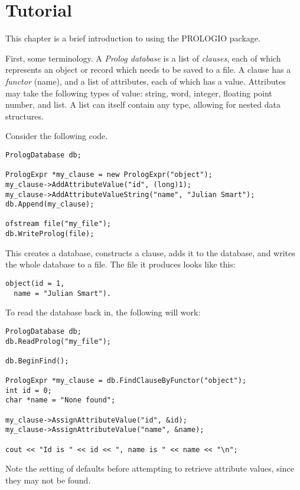 \chapter{Tutorial}

This chapter is a brief introduction to using the PROLOGIO package.

First, some terminology.  A {\it Prolog database}\/ is a list of {\it clauses},
each of which represents an object or record which needs to be saved to a file.
A clause has a {\it functor}\/ (name), and a list of attributes, each of which
has a value.  Attributes may take the following types of value: string, word,
integer, floating point number, and list.  A list can itself contain any
type, allowing for nested data structures.

Consider the following code.

\begin{verbatim}
PrologDatabase db;

PrologExpr *my_clause = new PrologExpr("object");
my_clause->AddAttributeValue("id", (long)1);
my_clause->AddAttributeValueString("name", "Julian Smart");
db.Append(my_clause);

ofstream file("my_file");
db.WriteProlog(file);
\end{verbatim}

This creates a database, constructs a clause, adds it to the database,
and writes the whole database to a file.  The file it produces looks like
this:

\begin{verbatim}
object(id = 1,
  name = "Julian Smart").
\end{verbatim}

To read the database back in, the following will work:

\begin{verbatim}
PrologDatabase db;
db.ReadProlog("my_file");

db.BeginFind();

PrologExpr *my_clause = db.FindClauseByFunctor("object");
int id = 0;
char *name = "None found";

my_clause->AssignAttributeValue("id", &id);
my_clause->AssignAttributeValue("name", &name);

cout << "Id is " << id << ", name is " << name << "\n";
\end{verbatim}

Note the setting of defaults before attempting to retrieve attribute values,
since they may not be found.
